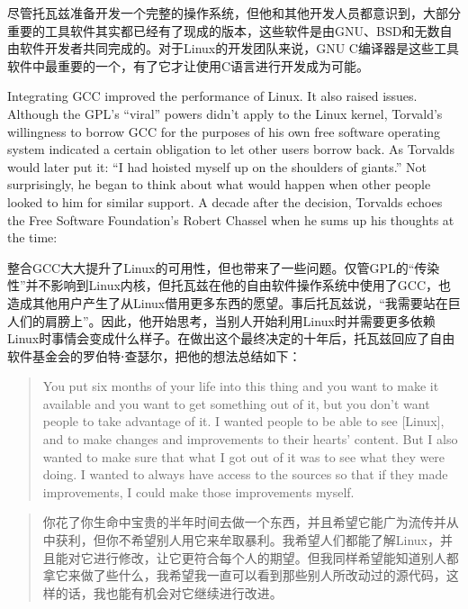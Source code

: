 \ifdefined\chs
尽管托瓦兹准备开发一个完整的操作系统，但他和其他开发人员都意识到，大部分重要的工具软件其实都已经有了现成的版本，这些软件是由GNU、BSD和无数自由软件开发者共同完成的。对于Linux的开发团队来说，GNU C编译器是这些工具软件中最重要的一个，有了它才让使用C语言进行开发成为可能。
\fi

\ifdefined\eng
Integrating GCC improved the performance of Linux. It also raised issues. Although the GPL's ``viral'' powers didn't apply to the Linux kernel, Torvald's willingness to borrow GCC for the purposes of his own free software operating system indicated a certain obligation to let other users borrow back. As Torvalds would later put it: ``I had hoisted myself up on the shoulders of giants.'' Not surprisingly, he began to think about what would happen when other people looked to him for similar support. A decade after the decision, Torvalds echoes the Free Software Foundation's Robert Chassel when he sums up his thoughts at the time:
\fi

\ifdefined\chs
整合GCC大大提升了Linux的可用性，但也带来了一些问题。仅管GPL的``传染性''并不影响到Linux内核，但托瓦兹在他的自由软件操作系统中使用了GCC，也造成其他用户产生了从Linux借用更多东西的愿望。事后托瓦兹说，``我需要站在巨人们的肩膀上''。因此，他开始思考，当别人开始利用Linux时并需要更多依赖Linux时事情会变成什么样子。在做出这个最终决定的十年后，托瓦兹回应了自由软件基金会的罗伯特⋅查瑟尔，把他的想法总结如下：
\fi

\ifdefined\eng
\begin{quote}
You put six months of your life into this thing and you want to make it available and you want to get something out of it, but you don't want people to take advantage of it. I wanted people to be able to see [Linux], and to make changes and improvements to their hearts' content. But I also wanted to make sure that what I got out of it was to see what they were doing. I wanted to always have access to the sources so that if they made improvements, I could make those improvements myself.
\end{quote}
\fi

\ifdefined\chs
\begin{quote}
你花了你生命中宝贵的半年时间去做一个东西，并且希望它能广为流传并从中获利，但你不希望别人用它来牟取暴利。我希望人们都能了解Linux，并且能对它进行修改，让它更符合每个人的期望。但我同样希望能知道别人都拿它来做了些什么，我希望我一直可以看到那些别人所改动过的源代码，这样的话，我也能有机会对它继续进行改进。
\end{quote}
\fi

